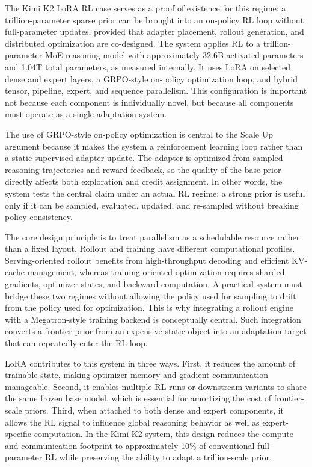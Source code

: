 \documentclass{llmxive}
\begin{document}
The Kimi K2 LoRA RL case serves as a proof of existence for this regime: a trillion-parameter sparse prior can be brought into an on-policy RL loop without full-parameter updates, provided that adapter placement, rollout generation, and distributed optimization are co-designed. The system applies RL to a trillion-parameter MoE reasoning model with approximately 32.6B activated parameters and 1.04T total parameters, as measured internally. It uses LoRA on selected dense and expert layers, a GRPO-style on-policy optimization loop, and hybrid tensor, pipeline, expert, and sequence parallelism. This configuration is important not because each component is individually novel, but because all components must operate as a single adaptation system.

The use of GRPO-style on-policy optimization is central to the Scale Up argument because it makes the system a reinforcement learning loop rather than a static supervised adapter update. The adapter is optimized from sampled reasoning trajectories and reward feedback, so the quality of the base prior directly affects both exploration and credit assignment. In other words, the system tests the central claim under an actual RL regime: a strong prior is useful only if it can be sampled, evaluated, updated, and re-sampled without breaking policy consistency.

The core design principle is to treat parallelism as a schedulable resource rather than a fixed layout. Rollout and training have different computational profiles. Serving-oriented rollout benefits from high-throughput decoding and efficient KV-cache management, whereas training-oriented optimization requires sharded gradients, optimizer states, and backward computation. A practical system must bridge these two regimes without allowing the policy used for sampling to drift from the policy used for optimization. This is why integrating a rollout engine with a Megatron-style training backend is conceptually central. Such integration converts a frontier prior from an expensive static object into an adaptation target that can repeatedly enter the RL loop.

LoRA contributes to this system in three ways. First, it reduces the amount of trainable state, making optimizer memory and gradient communication manageable. Second, it enables multiple RL runs or downstream variants to share the same frozen base model, which is essential for amortizing the cost of frontier-scale priors. Third, when attached to both dense and expert components, it allows the RL signal to influence global reasoning behavior as well as expert-specific computation. In the Kimi K2 system, this design reduces the compute and communication footprint to approximately 10\% of conventional full-parameter RL while preserving the ability to adapt a trillion-scale prior.
\end{document}
